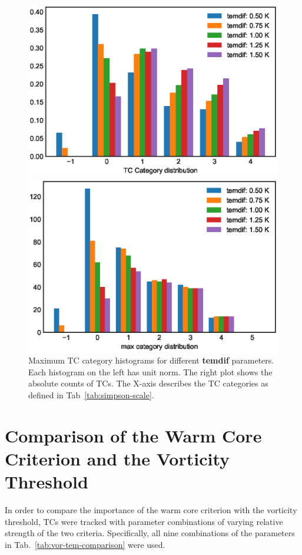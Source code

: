 \begin{figure}[ht]
	\begin{minipage}[t]{0.48\textwidth}
		\includegraphics[width = \textwidth]{img/max_cat_distr_temdifs.eps}
	\end{minipage}
	\hfill
	\begin{minipage}[t]{0.48\textwidth}
		\includegraphics[width = \textwidth]{img/max_cat_counts_temdifs.eps}
	\end{minipage}
	\caption{Maximum TC category histograms for different \textbf{temdif} parameters. Each histogram on the left has unit norm. The right plot shows the absolute counts of TCs. The X-axis describes the TC categories as defined in Tab~\ref{tab:simpson-scale}.}
	\label{fig:temdif-analysis}
\end{figure}


\section{Comparison of the Warm Core Criterion and the Vorticity Threshold}\label{sec:warmcore-var}
In order to compare the importance of the warm core criterion with the vorticity threshold, TCs were tracked with parameter combinations of varying relative strength of the two criteria. Specifically, all nine combinations of the parameters in Tab.~\ref{tab:vor-tem-comparison} were used.

